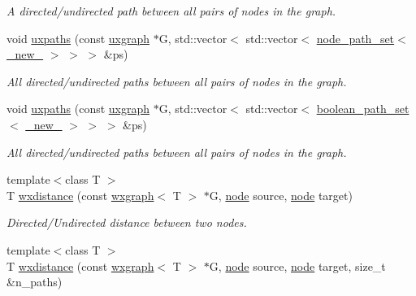 \begin{DoxyCompactItemize}
\begin{DoxyCompactList}\small\item\em A directed/undirected path between all pairs of nodes in the graph. \end{DoxyCompactList}\item 
void \hyperlink{namespacelgraph_1_1traversal_a26efdc24fea2108a7c1a4a138356b236}{uxpaths} (const \hyperlink{classlgraph_1_1uxgraph}{uxgraph} $\ast$G, std\-::vector$<$ std\-::vector$<$ \hyperlink{namespacelgraph_a0570ce57129123d5816913d287f6cc73}{node\-\_\-path\-\_\-set}$<$ \hyperlink{namespacelgraph_a2836f966c1c36b43da337d8907728ec0}{\-\_\-new\-\_\-} $>$ $>$ $>$ \&ps)
\begin{DoxyCompactList}\small\item\em All directed/undirected paths between all pairs of nodes in the graph. \end{DoxyCompactList}\item 
void \hyperlink{namespacelgraph_1_1traversal_a225d7bc5b36ef1863ad035ce1a8cb83b}{uxpaths} (const \hyperlink{classlgraph_1_1uxgraph}{uxgraph} $\ast$G, std\-::vector$<$ std\-::vector$<$ \hyperlink{namespacelgraph_afad432931ba600ab1628d5c9595986c5}{boolean\-\_\-path\-\_\-set}$<$ \hyperlink{namespacelgraph_a2836f966c1c36b43da337d8907728ec0}{\-\_\-new\-\_\-} $>$ $>$ $>$ \&ps)
\begin{DoxyCompactList}\small\item\em All directed/undirected paths between all pairs of nodes in the graph. \end{DoxyCompactList}\item 
{\footnotesize template$<$class T $>$ }\\T \hyperlink{namespacelgraph_1_1traversal_a6f7355bc246be223e074d737810f2fb4}{wxdistance} (const \hyperlink{classlgraph_1_1wxgraph}{wxgraph}$<$ T $>$ $\ast$G, \hyperlink{namespacelgraph_a397169dd66adf725210a30fb7251773e}{node} source, \hyperlink{namespacelgraph_a397169dd66adf725210a30fb7251773e}{node} target)
\begin{DoxyCompactList}\small\item\em Directed/\-Undirected distance between two nodes. \end{DoxyCompactList}\item 
{\footnotesize template$<$class T $>$ }\\T \hyperlink{namespacelgraph_1_1traversal_a39a6c5e2fa275d28c02051dbbd934e39}{wxdistance} (const \hyperlink{classlgraph_1_1wxgraph}{wxgraph}$<$ T $>$ $\ast$G, \hyperlink{namespacelgraph_a397169dd66adf725210a30fb7251773e}{node} source, \hyperlink{namespacelgraph_a397169dd66adf725210a30fb7251773e}{node} target, size\-\_\-t \&n\-\_\-paths)

\end{DoxyCompactItemize}
